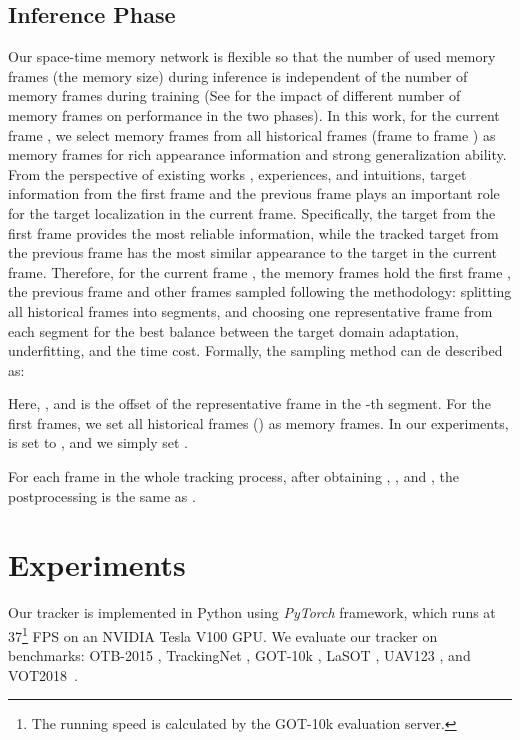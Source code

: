 \documentclass[final]{cvpr}
\begin{document}
\subsection{Inference Phase}\label{subsec:inference-phase}
Our space-time memory network is flexible so that the number of used memory frames (\ie the memory size) during inference is independent of the number of memory frames during training (See  for the impact of different number of memory frames on performance in the two phases).
In this work, for the current frame , we select  memory frames from all historical frames (\ie frame  to frame ) as memory frames for rich appearance information and strong generalization ability.
From the perspective of existing works \cite{voigtlaender2020siam,oh2019video}, experiences, and intuitions, target information from the first frame and the previous frame plays an important role for the target localization in the current frame.
Specifically, the target from the first frame provides the most reliable information, while the tracked target from the previous frame has the most similar appearance to the target in the current frame.
Therefore, for the current frame , the memory frames hold the first frame , the previous frame  and other  frames  sampled following the methodology: splitting all historical frames into  segments, and choosing one representative frame from each segment for the best balance between the target domain adaptation, underfitting, and the time cost.
Formally, the sampling method can de described as:

Here, , and  is the offset of the representative frame in the -th segment.
For the first  frames, we set all historical frames (\ie ) as memory frames.
In our experiments,  is set to , and we simply set .

For each frame in the whole tracking process, after obtaining , , and , the postprocessing is the same as \cite{xu2020siamfc++}.

\section{Experiments}
Our tracker is implemented in Python using \textit{PyTorch} framework, which runs at 37\footnote{The running speed is calculated by the GOT-10k evaluation server.} FPS on an NVIDIA Tesla V100 GPU.
We evaluate our tracker on benchmarks: OTB-2015 \cite{otb2015}, TrackingNet \cite{muller2018trackingnet}, GOT-10k \cite{huang2019got}, LaSOT \cite{fan2019lasot}, UAV123 \cite{mueller2016benchmark}, and VOT2018~\cite{kristan2018sixth}.
\end{document}
